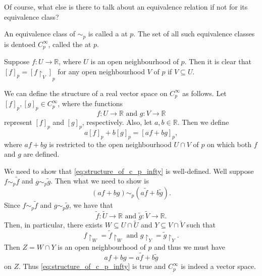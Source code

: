\documentclass[notoc,notitlepage]{tufte-book}
\begin{document}
Of course, what else is there to talk about an equivalence relation if not for its
equivalence class?

\begin{defn}\label{defn:germ_of_functions}
  An equivalence class of $\sim_p$ is called a  at $p$.
  The set of all such equivalence classes is dentoed $C_p^{\infty}$, called the
   at $p$.
\end{defn}

\begin{note}
  Suppose $f : U \to \mathbb{R}$, where $U$ is an open neighbourhood of $p$. Then it
  is clear that $[f]_p = [f \restriction_V]_p$ for any open neighbourhood $V$ of $p$
  if $V \subseteq U$.
\end{note}

We can define the structure of a real vector space on $C_p^{\infty}$ as follows. Let
$[f]_p, [g]_p \in C_p^{\infty}$, where the functions
\begin{equation*}
  f : U \to \mathbb{R} \text{ and } g : V \to \mathbb{R}
\end{equation*}
represent $[f]_p$ and $[g]_p$, respectively. Also, let $a, b \in \mathbb{R}$. Then we
define
\begin{equation}\label{eq:structure_of_c_p_infty}
  a[f]_p + b[g]_p = [af + bg]_p,
\end{equation}
where $af + bg$ is restricted to the open neighbourhood $U \cap V$ of $p$ on which
both $f$ and $g$ are defined.

We need to show that \cref{eq:structure_of_c_p_infty} is well-defined. Well suppose
$f \sim_p \tilde{f}$ and $g \sim_p \tilde{g}$. Then what we need to show is
\begin{equation*}
  (af + bg) \sim_p (a\tilde{f} + b\tilde{g}).
\end{equation*}
Since $f \sim_p \tilde{f}$ and $g \sim_p \tilde{g}$, we have that
\begin{equation*}
  \tilde{f} : \tilde{U} \to \mathbb{R} \text{ and } \tilde{g} : \tilde{V} \to \mathbb{R}.
\end{equation*}
Then, in particular, there exists $W \subseteq U \cap \tilde{U}$ and $Y \subseteq V
\cap \tilde{V}$ such that
\begin{equation*}
  f \restriction_W = \tilde{f} \restriction_W \text{ and }
  g \restriction_Y = \tilde{g} \restriction_Y.
\end{equation*}
Then $Z = W \cap Y$ is an open neighbourhood of $p$ and thus we must have
\begin{equation*}
  af + bg = a\tilde{f} + b \tilde{g}
\end{equation*}
on $Z$. Thus \cref{eq:structure_of_c_p_infty} is true and $C_p^{\infty}$ is indeed
a vector space.
\end{document}
